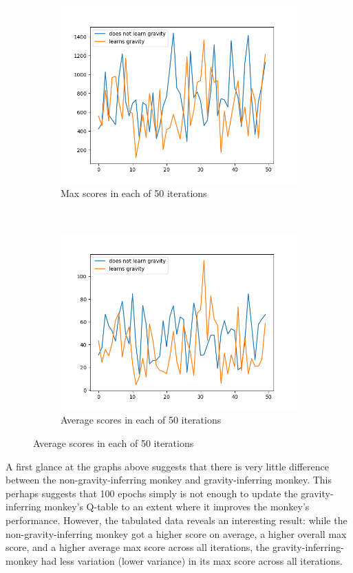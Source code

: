 \documentclass[submit]{harvardml}
\begin{document}
\begin{figure}[H]
    \begin{subfigure}
        \centering
        \includegraphics[width=0.5\linewidth]{HW6/plots/prob3_max_scores.png}
        \captionsetup{labelformat=empty}
        \caption{Max scores in each of 50 iterations}
    \end{subfigure}%
    ~
    \begin{subfigure}
        \centering
        \includegraphics[width=0.5\linewidth]{HW6/plots/prob3_av_scores.png}
        \captionsetup{labelformat=empty}
        \caption{Average scores in each of 50 iterations}
    \end{subfigure}
\end{figure}

A first glance at the graphs above suggests that there is very little difference between the non-gravity-inferring monkey and gravity-inferring monkey. This perhaps suggests that 100 epochs simply is not enough to update the gravity-inferring monkey's Q-table to an extent where it improves the monkey's performance. However, the tabulated data reveals an interesting result: while the non-gravity-inferring monkey got a higher score on average, a higher overall max score, and a higher average max score across all iterations, the gravity-inferring-monkey had less variation (lower variance) in its max score across all iterations.
\end{document}
